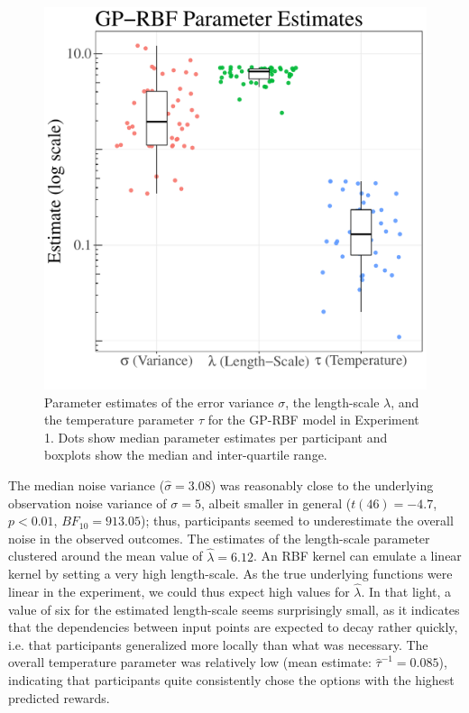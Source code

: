 \documentclass[a4paper,natbib]{apa6}
\begin{document}
\begin{figure}[ht!]
\centering
\includegraphics[scale=0.5]{par1.pdf}
\caption{Parameter estimates of the error variance $\sigma$, the length-scale $\lambda$, and the temperature parameter $\tau$ for the GP-RBF model in Experiment 1. Dots show median parameter estimates per participant and boxplots show the median and inter-quartile range.}
\label{fig:par1}
\end{figure}

The median noise variance ($\hat{\sigma}=3.08$) was reasonably close to the underlying observation noise variance of $\sigma=5$, albeit smaller in general ($t(46)= -4.7$, $p<0.01$, $BF_{10}=913.05$); thus, participants seemed to underestimate the overall noise in the observed outcomes. The estimates of the length-scale parameter clustered around the mean value of $\hat{\lambda}=6.12$. An RBF kernel can emulate a linear kernel by setting a very high length-scale. As the true underlying functions were linear in the experiment, we could thus expect high values for $\hat{\lambda}$. In that light, a value of six for the estimated length-scale seems surprisingly small, as it indicates that the dependencies between input points are expected to decay rather quickly, i.e. that participants generalized more locally than what was necessary. The overall temperature parameter was relatively low (mean estimate: $\hat{\tau}^{-1}=0.085$), indicating that participants quite consistently chose the options with the highest predicted rewards. 
\end{document}
